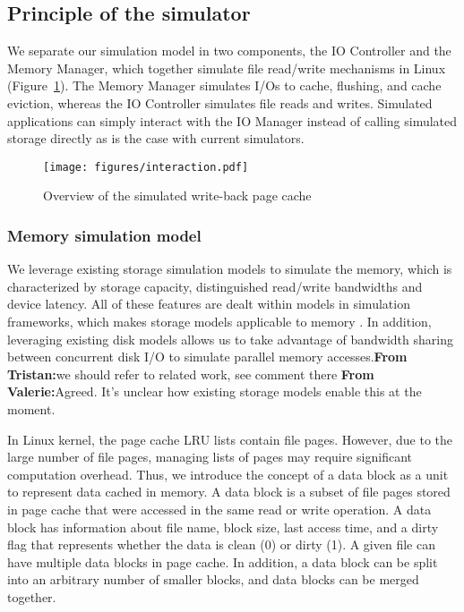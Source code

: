 \documentclass[conference]{IEEEtran}
\newcommand{\tristan}[1]{\color{orange}\textbf{From Tristan:}#1\color{black}}
\newcommand{\valerie}[1]{\color{blue}\textbf{From Valerie:}#1\color{black}}
\begin{document}
		\subsection{Principle of the simulator}
	
            We separate our simulation model in two components, the IO
			Controller and the Memory Manager, which together simulate 
			file read/write mechanisms in Linux (Figure~\ref{fig:interaction}). 
			The Memory Manager simulates I/Os to cache, flushing, and cache eviction, 
			whereas the IO Controller simulates file reads and writes. 
			Simulated applications can simply interact with the IO Manager instead of 
			calling simulated storage directly as is the case with current simulators.

			\begin{figure}
   				\centering
   				\texttt{[image: figures/interaction.pdf]}
   				\caption{Overview of the simulated write-back page cache}\label{fig:interaction}
			\end{figure}	

			\subsubsection{Memory simulation model}
			
			We leverage existing storage simulation models to simulate the memory,
			which is characterized by storage capacity, distinguished read/write 
			bandwidths and device latency. 
			All of these features are dealt within models in simulation 
			frameworks, which makes storage models applicable to memory \cite{lebre2015}. 
			In addition, leveraging existing disk models allows us 
			to take advantage of bandwidth sharing between concurrent disk I/O to 
			simulate parallel memory accesses.\tristan{we should refer to related work, 
            see comment there} \valerie{Agreed. It's unclear how existing storage models enable this at the moment}.

			In Linux kernel, the page cache LRU lists contain file pages. However, 
			due to the large number of file pages, managing lists of pages may 
			require significant computation overhead. 
			Thus, we introduce the concept of a data block as a unit to represent data 
			cached in memory. A data block is a subset of file pages stored in
            page cache that were accessed in the same read or write operation. 
			A data block has information about file name, block size, last access 
			time, and a dirty flag that represents whether the data is clean (0) 
			or dirty (1). 
			A given file can have multiple data blocks in page cache. In
			addition, a data block can be split into an arbitrary number of
			smaller blocks, and data blocks can be merged together.
\end{document}
